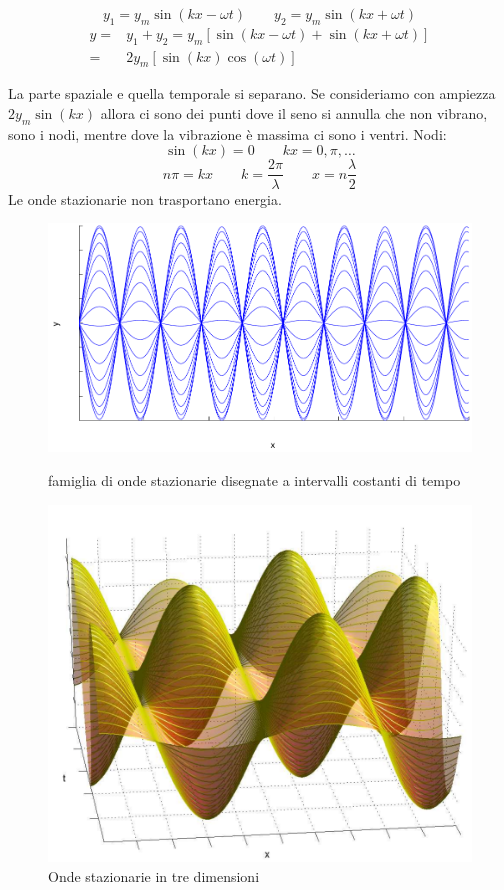 \parbox[]{\textwidth}{
\[
y_1=y_m\sin\left(kx-\omega t\right)\qquad y_2=y_m\sin\left(kx+\omega t\right)
\]
\begin{align*}
y=&y_1+y_2=y_m\left[\sin\left(kx-\omega t\right)+\sin\left(kx+\omega t\right)\right]\\
=&2y_m\left[\sin\left(kx\right)\cos\left(\omega t\right)\right]
\end{align*}
}
La parte spaziale e quella temporale si separano. Se consideriamo con ampiezza $2y_m\sin\left(kx\right)$ allora ci sono dei punti dove il seno si annulla che non vibrano, sono i nodi, mentre dove la vibrazione è massima ci sono i ventri. Nodi:
\[\sin\left(kx\right)=0\qquad kx=0,\pi,\ldots\]
\[n\pi=kx\qquad k=\frac{2\pi}{\lambda}\qquad x=n\frac{\lambda}{2}\]
Le onde stazionarie non trasportano energia.
\begin{figure}[htbp]
   \centering
   \includegraphics[scale=0.5]{immagini/fisica1/stazionarie1}
   \caption{famiglia di onde stazionarie disegnate a intervalli costanti di tempo}
   \includegraphics[scale=0.7]{immagini/fisica1/stazionarie2}
   \caption{Onde stazionarie in tre dimensioni}
\end{figure}

